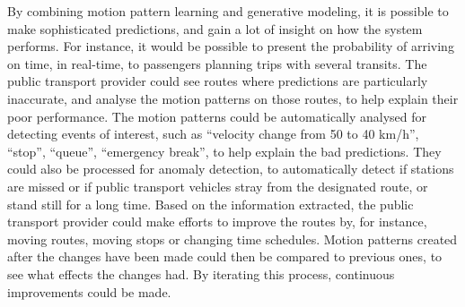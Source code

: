 By combining motion pattern learning and generative modeling,
it is possible to make sophisticated predictions, and gain a lot of
insight on how the system performs. For instance, it would be
possible to present the probability of arriving on time, in
real-time, to passengers planning trips with several transits.
The public transport provider could see routes where
predictions are particularly inaccurate, and analyse the motion
patterns on those routes, to help explain their poor performance. 
The motion patterns could be automatically analysed for
detecting events of interest, such as ``velocity change from 50 to 40
km/h'', ``stop'', ``queue'', ``emergency break'', to help explain the
bad predictions. They could also be processed for anomaly
detection, to automatically detect if stations are missed or if public
transport vehicles stray from the designated route, or stand still for
a long time.
Based on the information extracted, the public transport provider
could make efforts to improve the routes by, for instance, moving routes, moving stops or changing
time schedules. Motion patterns created after the changes have been
made could then be compared to previous ones, to see what effects
the changes had. By iterating this process, continuous improvements
could be made.




